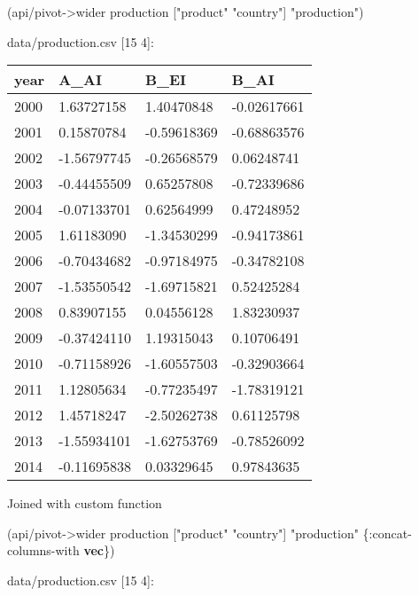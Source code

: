 \documentclass[]{article}
\newenvironment{Shaded}{\begin{snugshade}}{\end{snugshade}}
\newcommand{\AttributeTok}[1]{\textcolor[rgb]{0.77,0.63,0.00}{#1}}
\newcommand{\KeywordTok}[1]{\textcolor[rgb]{0.13,0.29,0.53}{\textbf{#1}}}
\newcommand{\NormalTok}[1]{#1}
\newcommand{\StringTok}[1]{\textcolor[rgb]{0.31,0.60,0.02}{#1}}
\begin{document}
\begin{Shaded}
\begin{Highlighting}[]
\NormalTok{(api/pivot->wider production [}\StringTok{"product"} \StringTok{"country"}\NormalTok{] }\StringTok{"production"}\NormalTok{)}
\end{Highlighting}
\end{Shaded}

data/production.csv {[}15 4{]}:

\begin{longtable}[]{@{}llll@{}}
\toprule
year & A\_AI & B\_EI & B\_AI\tabularnewline
\midrule
\endhead
2000 & 1.63727158 & 1.40470848 & -0.02617661\tabularnewline
2001 & 0.15870784 & -0.59618369 & -0.68863576\tabularnewline
2002 & -1.56797745 & -0.26568579 & 0.06248741\tabularnewline
2003 & -0.44455509 & 0.65257808 & -0.72339686\tabularnewline
2004 & -0.07133701 & 0.62564999 & 0.47248952\tabularnewline
2005 & 1.61183090 & -1.34530299 & -0.94173861\tabularnewline
2006 & -0.70434682 & -0.97184975 & -0.34782108\tabularnewline
2007 & -1.53550542 & -1.69715821 & 0.52425284\tabularnewline
2008 & 0.83907155 & 0.04556128 & 1.83230937\tabularnewline
2009 & -0.37424110 & 1.19315043 & 0.10706491\tabularnewline
2010 & -0.71158926 & -1.60557503 & -0.32903664\tabularnewline
2011 & 1.12805634 & -0.77235497 & -1.78319121\tabularnewline
2012 & 1.45718247 & -2.50262738 & 0.61125798\tabularnewline
2013 & -1.55934101 & -1.62753769 & -0.78526092\tabularnewline
2014 & -0.11695838 & 0.03329645 & 0.97843635\tabularnewline
\bottomrule
\end{longtable}

Joined with custom function

\begin{Shaded}
\begin{Highlighting}[]
\NormalTok{(api/pivot->wider production [}\StringTok{"product"} \StringTok{"country"}\NormalTok{] }\StringTok{"production"}\NormalTok{ \{}\AttributeTok{:concat-columns-with} \KeywordTok{vec}\NormalTok{\})}
\end{Highlighting}
\end{Shaded}

data/production.csv {[}15 4{]}:
\end{document}
